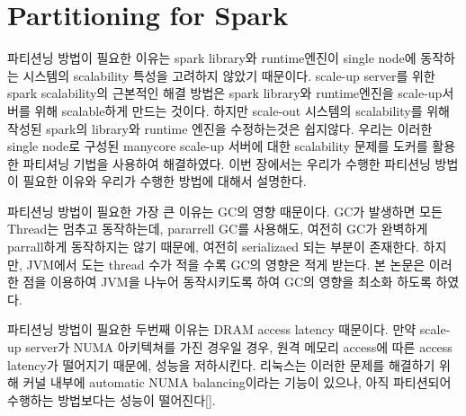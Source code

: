\section{Partitioning for Spark}
\ifkor
파티션닝 방법이 필요한 이유는 spark library와 runtime엔진이 single node에 동작하는 
시스템의 scalability 특성을 고려하지 않았기 때문이다. 
scale-up server를 위한 spark scalability의 근본적인 해결 방법은 spark library와 
runtime엔진을 scale-up서버를 위해 scalable하게 만드는 것이다.
하지만 scale-out 시스템의 scalability를 위해 작성된 spark의 library와 runtime 엔진을 
수정하는것은 쉽지않다.
우리는 이러한 single node로 구성된 manycore scale-up 서버에 대한 scalability
문제를 도커를 활용한 파티셔닝 기법을 사용하여 해결하였다.
이번 장에서는 우리가 수행한 파티션닝 방법이 필요한 이유와 우리가 수행한 방법에 대해서 설명한다.
\else

\fi


\ifkor
파티션닝 방법이 필요한 가장 큰 이유는 GC의 영향 때문이다. 
GC가 발생하면 모든 Thread는 멈추고 동작하는데, pararrell GC를 사용해도, 여전히 
GC가 완벽하게 parrall하게 동작하지는 않기 때문에, 여전히 serializaed 되는 부분이 존재한다.
하지만, JVM에서 도는 thread 수가 적을 수록 GC의 영향은 적게 받는다. 
본 논문은 이러한 점을 이용하여 JVM을 나누어 동작시키도록 하여 GC의 영향을 최소화 하도록
하였다. 
\else

\fi

\ifkor
파티션닝 방법이 필요한 두번째 이유는 DRAM access latency 때문이다. 
만약 scale-up server가 NUMA 아키텍쳐를 가진 경우일 경우, 
원격 메모리 access에 따른 access latency가 떨어지기 때문에, 성능을 저하시킨다.
리눅스는 이러한 문제를 해결하기 위해 커널 내부에 automatic NUMA balancing이라는 기능이 있으나, 
아직 파티션되어 수행하는 방법보다는 성능이 떨어진다[]. 
\else

